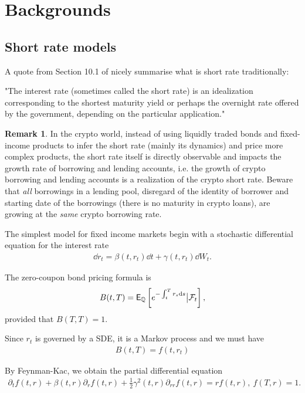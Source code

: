 \documentclass[square]{article} %
\theoremstyle{plain}
\theoremstyle{definition} %
\newtheorem{remark}[theorem]{Remark}
\begin{document}
\section{Backgrounds}
\subsection{Short rate models}
A quote from Section 10.1 of \cite{Shreve2004a} nicely summarise what is short rate traditionally:
\begin{displayquote}
  "The interest rate (sometimes called the short rate) is an {\color{red} idealization} corresponding to the shortest maturity yield or perhaps the overnight rate offered by the government, depending on the particular application."
\end{displayquote}

\begin{remark}In the crypto world, instead of using liquidly traded bonds and fixed-income products to infer the short rate (mainly its dynamics) and price more complex products,
 the short rate itself is directly observable and impacts the growth rate of borrowing and lending accounts,
 i.e. the growth of crypto borrowing and lending accounts is a {\color{red} realization} of the crypto short rate.
 Beware that {\it all} borrowings in a lending pool, disregard of the identity of borrower and starting date of the borrowings (there is no maturity in crypto loans),
 are growing at the {\it{same}} crypto borrowing rate. \end{remark}

The simplest model for fixed income markets begin with a stochastic differential equation for the interest rate
\begin{align*}
  \dd r_t = \beta(t, r_t)\dd t + \gamma(t, r_t)\dd W_t.
\end{align*}

The zero-coupon bond pricing formula is
\begin{align*}
B(t,T) = {\mathbb{\sf E}}_\mathbb{Q}\left[
e^{-\int_t^T r_s {\rm d} s}\big|\mathcal{F}_t
\right],
\end{align*}
provided that $B(T,T)=1$. 

Since $r_t$ is governed by a SDE, it is a Markov process and we must have
\begin{align*}
B(t,T) = f(t, r_t)
\end{align*}

By Feynman-Kac, we obtain the partial differential equation
\begin{align*}
\partial_t f(t,r) + \beta(t,r)\partial_r f(t,r)+ \frac{1}{2}\gamma^2(t,r)\partial_{rr}f(t,r) = r f(t,r),\  
f(T, r)=1.
\end{align*}
\end{document}
